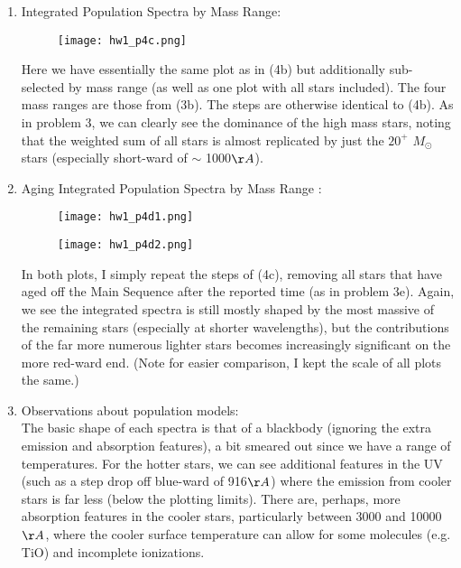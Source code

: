 \documentclass[11pt]{article}
\begin{document}
\begin{enumerate}
\begin{enumerate}
		  
\newpage 		  
  	\item %
 	  Integrated Population Spectra by Mass Range:
 	  
			  \begin{figure}[H]
  			  		\texttt{[image: hw1\_p4c.png]}
  			  		\label{fig:fig9}
			  \end{figure}
			  
			  
	Here we have essentially the same plot as in (4b) but additionally sub-selected by mass range (as well as one plot with all stars included). The four mass ranges are those from (3b). The steps are otherwise identical to (4b). As in problem 3, we can clearly see the dominance of the high mass stars, noting that the weighted sum of all stars is almost replicated by just the $20^{+}$ $M_{\odot}$ stars (especially short-ward of $\sim$ 1000$\AA$).\\


			  
	\item %
		Aging Integrated Population Spectra by Mass Range :
\newpage 
			\begin{figure}[H]
			  		\texttt{[image: hw1\_p4d1.png]}
			  		\label{fig:fig10}
			\end{figure}
			
			\begin{figure}[H]
			  		\texttt{[image: hw1\_p4d2.png]}
			  		\label{fig:fig11}
			\end{figure}

	In both plots, I simply repeat the steps of (4c), removing all stars that have aged off the Main Sequence after the reported time (as in problem 3e). Again, we see the integrated spectra is still mostly shaped by the most massive of the remaining stars (especially at shorter wavelengths), but the contributions of the far more numerous lighter stars becomes increasingly significant on the more red-ward end. (Note for easier comparison, I kept the scale of all plots the same.)\\

	\item %
		Observations about population models:\\
		
		The basic shape of each spectra is that of a blackbody (ignoring the extra emission and absorption features), a bit smeared out since we have a range of temperatures. For the hotter stars, we can see additional features in the UV (such as a step drop off blue-ward of 916$\AA$) where the emission from cooler stars is far less (below the plotting limits). There are, perhaps, more absorption features in the cooler stars, particularly between 3000 and 10000 $\AA$, where the cooler surface temperature can allow for some molecules (e.g. TiO) and incomplete ionizations.\\
		

\end{enumerate}
\end{enumerate}
\end{document}
